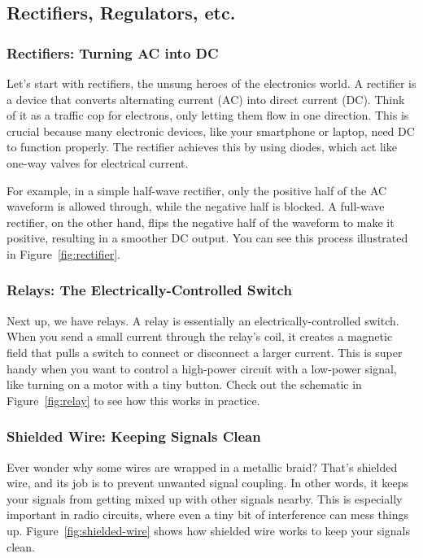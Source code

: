 \subsection{Rectifiers, Regulators, etc.}
\label{subsec:rect-reg}

\subsubsection*{Rectifiers: Turning AC into DC}
Let's start with rectifiers, the unsung heroes of the electronics world. A rectifier is a device that converts alternating current (AC) into direct current (DC). Think of it as a traffic cop for electrons, only letting them flow in one direction. This is crucial because many electronic devices, like your smartphone or laptop, need DC to function properly. The rectifier achieves this by using diodes, which act like one-way valves for electrical current. 

For example, in a simple half-wave rectifier, only the positive half of the AC waveform is allowed through, while the negative half is blocked. A full-wave rectifier, on the other hand, flips the negative half of the waveform to make it positive, resulting in a smoother DC output. You can see this process illustrated in Figure~\ref{fig:rectifier}.

\subsubsection*{Relays: The Electrically-Controlled Switch}
Next up, we have relays. A relay is essentially an electrically-controlled switch. When you send a small current through the relay's coil, it creates a magnetic field that pulls a switch to connect or disconnect a larger current. This is super handy when you want to control a high-power circuit with a low-power signal, like turning on a motor with a tiny button. Check out the schematic in Figure~\ref{fig:relay} to see how this works in practice.

\subsubsection*{Shielded Wire: Keeping Signals Clean}
Ever wonder why some wires are wrapped in a metallic braid? That's shielded wire, and its job is to prevent unwanted signal coupling. In other words, it keeps your signals from getting mixed up with other signals nearby. This is especially important in radio circuits, where even a tiny bit of interference can mess things up. Figure~\ref{fig:shielded-wire} shows how shielded wire works to keep your signals clean.

